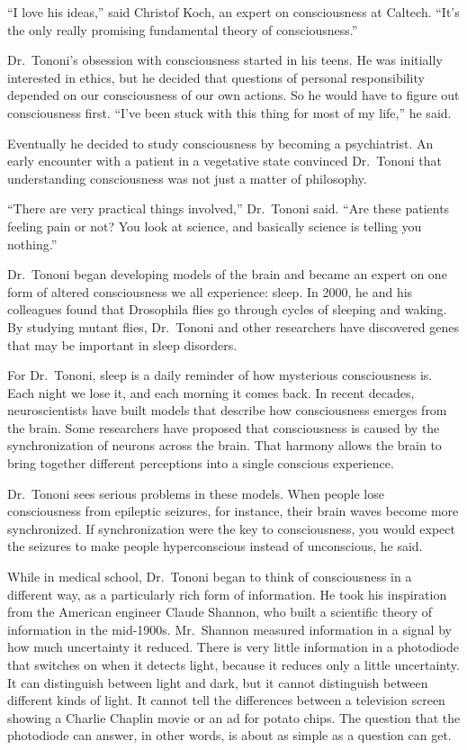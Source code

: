 ﻿\documentclass[12pt]{article}
\begin{document}
``I love his ideas,'' said Christof Koch, an expert on consciousness at Caltech. ``It's the only
really promising fundamental theory of consciousness.''

Dr.~Tononi's obsession with consciousness started in his teens. He was initially interested in
ethics, but he decided that questions of personal responsibility depended on our consciousness of
our own actions. So he would have to figure out consciousness first. ``I've been stuck with this
thing for most of my life,'' he said.

Eventually he decided to study consciousness by becoming a psychiatrist. An early encounter with a
patient in a vegetative state convinced Dr.~Tononi that understanding consciousness was not just a
matter of philosophy.

``There are very practical things involved,'' Dr.~Tononi said. ``Are these patients feeling pain or
not? You look at science, and basically science is telling you nothing.''

Dr.~Tononi began developing models of the brain and became an expert on one form of altered
consciousness we all experience: sleep. In 2000, he and his colleagues found that Drosophila flies
go through cycles of sleeping and waking. By studying mutant flies, Dr.~Tononi and other researchers
have discovered genes that may be important in sleep disorders.

For Dr.~Tononi, sleep is a daily reminder of how mysterious consciousness is. Each night we lose it,
and each morning it comes back. In recent decades, neuroscientists have built models that describe
how consciousness emerges from the brain. Some researchers have proposed that consciousness is
caused by the synchronization of neurons across the brain. That harmony allows the brain to bring
together different perceptions into a single conscious experience.

Dr.~Tononi sees serious problems in these models. When people lose consciousness from epileptic
seizures, for instance, their brain waves become more synchronized. If synchronization were the key
to consciousness, you would expect the seizures to make people hyperconscious instead of
unconscious, he said.

While in medical school, Dr.~Tononi began to think of consciousness in a different way, as a
particularly rich form of information. He took his inspiration from the American engineer Claude
Shannon, who built a scientific theory of information in the mid-1900s. Mr.~Shannon measured
information in a signal by how much uncertainty it reduced. There is very little information in a
photodiode that switches on when it detects light, because it reduces only a little uncertainty. It
can distinguish between light and dark, but it cannot distinguish between different kinds of light.
It cannot tell the differences between a television screen showing a Charlie Chaplin movie or an ad
for potato chips. The question that the photodiode can answer, in other words, is about as simple as
a question can get.
\end{document}
